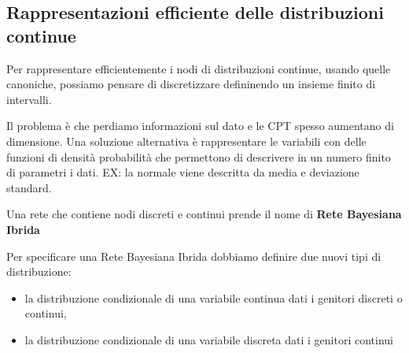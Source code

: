 \subsection{Rappresentazioni efficiente delle distribuzioni continue}
Per rappresentare efficientemente i nodi di distribuzioni continue, usando quelle
canoniche, possiamo pensare di discretizzare defininendo un insieme finito di intervalli.

Il problema è che perdiamo informazioni sul dato e le CPT spesso aumentano di dimensione.
Una soluzione alternativa è rappresentare le variabili con delle funzioni di densità
probabilità che permettono di descrivere in un numero finito di parametri i dati.
EX: la normale viene descritta da media e deviazione standard.

\begin{definizione}
    Una rete che contiene nodi discreti e continui prende il nome di \textbf{Rete 
    Bayesiana Ibrida}
\end{definizione}

Per specificare una Rete Bayesiana Ibrida dobbiamo definire due nuovi tipi di distribuzione:
\begin{itemize}
    \item la distribuzione condizionale di una variabile continua dati i genitori discreti o continui,
    \item la distribuzione condizionale di una variabile discreta dati i genitori continui
\end{itemize}